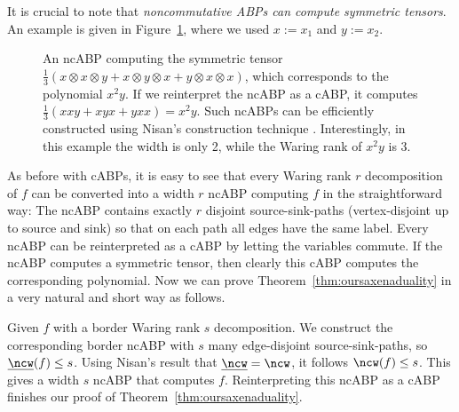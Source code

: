 It is crucial to note that \emph{noncommutative ABPs can compute symmetric tensors}.
An example is given in Figure~\ref{fig:ncabp}, where we used $x:=x_1$ and $y:=x_2$.
\begin{figure}
\centering
{}
\caption{An ncABP computing the symmetric tensor $\frac 1 3 (x\otimes x\otimes y + x\otimes y\otimes x + y\otimes x\otimes x)$, which corresponds to the polynomial $x^2 y$.
If we reinterpret the ncABP as a cABP, it computes $\frac 1 3 (xxy + xyx + yxx)= x^2 y$.
Such ncABPs can be efficiently constructed using Nisan's construction technique \cite{nisan1991lower}. Interestingly, in this example the width is only 2, while the Waring rank of $x^2 y$ is 3.}
\label{fig:ncabp}
\end{figure}
As before with cABPs, it is easy to see that every Waring rank $r$ decomposition of $f$ can be converted into a width $r$ ncABP computing $f$ in the straightforward way: The ncABP contains exactly $r$ disjoint source-sink-paths (vertex-disjoint up to source and sink) so that on each path all edges have the same label.
Every ncABP can be reinterpreted as a cABP by letting the variables commute. If the ncABP computes a symmetric tensor, then clearly this cABP computes the corresponding polynomial.
Now we can prove Theorem~\ref{thm:oursaxenaduality} in a very natural and short way as follows.

Given $f$ with a border Waring rank $s$ decomposition. We construct the corresponding border ncABP with $s$ many edge-disjoint source-sink-paths, so $\underline{\ncw}(f)\leq s$.
Using Nisan's result \cite{nisan1991lower} that $\underline{\ncw}=\ncw$, it follows $\ncw(f)\leq s$.
This gives a width $s$ ncABP that computes $f$.
Reinterpreting this ncABP as a cABP finishes our proof of Theorem~\ref{thm:oursaxenaduality}.





